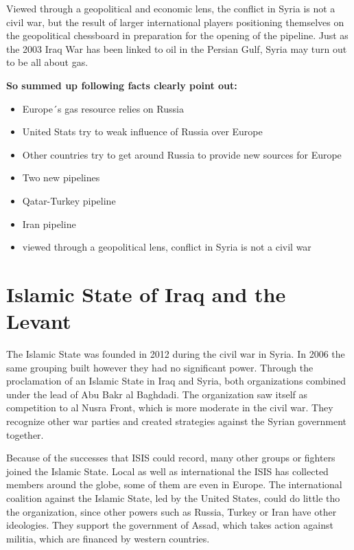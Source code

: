 Viewed through a geopolitical and economic lens, the conflict in Syria is not a civil war, but the result of larger international players positioning themselves on the geopolitical chessboard in preparation for the opening of the pipeline.
Just as the 2003 Iraq War has been linked to oil in the Persian Gulf, Syria may turn out to be all about gas.\newline

\textbf{So summed up following facts clearly point out:}
\begin{itemize}
	\item Europe´s gas resource relies on Russia
	\item United Stats try to weak influence of Russia over Europe
	\item Other countries try to get around Russia to provide new sources for Europe
	\item Two new pipelines
	\item Qatar-Turkey pipeline
	\item Iran pipeline
	\item viewed through a geopolitical lens, conflict in Syria is not a civil war
	
\end{itemize}


\section{Islamic State of Iraq and the Levant}

The Islamic State was founded in 2012 during the civil war in Syria. In 2006 the same grouping built however they had no significant power. Through the proclamation of an Islamic State in Iraq and Syria, both organizations combined under the lead of Abu Bakr al Baghdadi. The organization saw itself as competition to al Nusra Front, which is more moderate in the civil war. They recognize other war parties and created strategies against the Syrian government together.

Because of the successes that ISIS could record, many other groups or fighters joined the Islamic State. Local as well as international the ISIS has collected members around the globe, some of them are even in Europe. The international coalition against the Islamic State, led by the United States, could do little tho the organization, since other powers such as Russia, Turkey or Iran have other ideologies. They support the government of Assad, which takes action against militia, which are financed by western countries.

